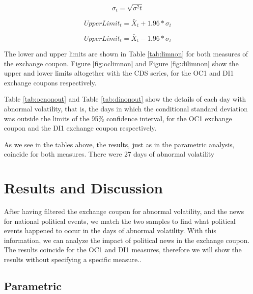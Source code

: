 \documentclass[cic,tc, english]{iiufrgs}
\begin{document}
    $$\sigma_t = \sqrt{\sigma^2t}$$

    \begin{equation}
        \label{eqn:upnp}
        UpperLimit_t = \bar{X}_t + 1.96 * \sigma_t
    \end{equation}

    \begin{equation}
        \label{eqn:lonp}
        UpperLimit_t = \bar{X}_t - 1.96 * \sigma_t
    \end{equation}

    The lower and upper limits are shown in Table \ref{tab:limnon} for both measures of the exchange coupon. Figure \ref{fig:oclimnon} and Figure \ref{fig:dilimnon} show the upper and lower limits altogether with the CDS series, for the OC1 and DI1 exchange coupons respectively.

    

    

    

    Table \ref{tab:ocnonout} and Table \ref{tab:dinonout} show the details of each day with abnormal volatility, that is, the days in which the conditional standard deviation was outside the limits of the 95\% confidence interval, for the OC1 exchange coupon and the DI1 exchange coupon respectively.

    

    

    As we see in the tables above, the results, just as in the parametric analysis, coincide for both measures. There were 27 days of abnormal volatility

\chapter{Results and Discussion} \label{chapter_results_discussion}

    After having filtered the exchange coupon for abnormal volatility, and the news for national political events, we match the two samples to find what political events happened to occur in the days of abnormal volatility. With this information, we can analyze the impact of political news in the exchange coupon. The results coincide for the OC1 and DI1 measures, therefore we will show the results without specifying a specific measure..

\section{Parametric}
\end{document}
